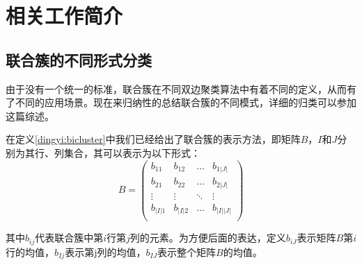 
\chapter{相关工作简介}
\label{chapter:rw}

\section{联合簇的不同形式分类}
\label{sec:bicluster}
由于没有一个统一的标准，联合簇在不同双边聚类算法中有着不同的定义，从而有了不同的应用场景。现在来归纳性的总结联合簇的不同模式，详细的归类可以参加这篇综述。

在定义\ref{dingyi:bicluster}中我们已经给出了联合簇的表示方法，即矩阵$B$，$I$和$J$分别为其行、列集合，其可以表示为以下形式：
\begin{equation*}
  B = \left(
    \begin{array}{cccc}
      b_{11} & b_{12} & \ldots & b_{1|J|} \\
      b_{21} & b_{22} & \ldots & b_{2|J|} \\
      \vdots & \vdots & \ddots & \vdots \\
      b_{|I|1} & b_{|I|2} & \ldots & b_{|I||J|} \\
    \end{array}
  \right)
\end{equation*}

其中$b_{ij}$代表联合簇中第$i$行第$j$列的元素。为方便后面的表达，定义$b_{iJ}$表示矩阵$B$第$i$行的均值，$b_{Ij}$表示第j列的均值，$b_{IJ}$表示整个矩阵$B$的均值。

